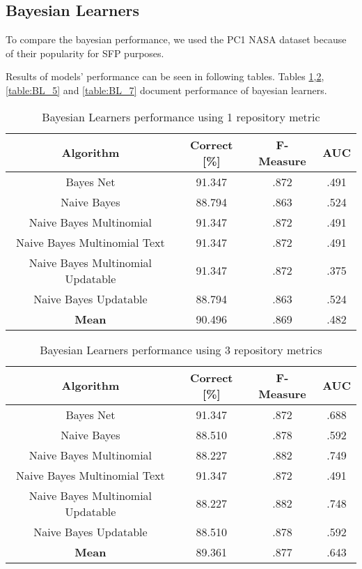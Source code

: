 \subsection{Bayesian Learners}
To compare the bayesian performance, we used the PC1 NASA dataset because of their popularity for SFP purposes.

Results of models' performance can be seen in following tables. Tables \ref{table:BL_1},\ref{table:BL_3}, \ref{table:BL_5} and \ref{table:BL_7} document performance of bayesian learners.				


\begin{table}[h!]		
\centering		
\begin{tabular}{ |c|c|c|c| } 		
 \hline		
 \textbf{Algorithm} & \textbf{Correct [\%]} & \textbf{F-Measure} & \textbf{AUC}  \\ 		
 \hline		
 Bayes Net & 91.347 & .872 & .491    \\ 		
 \hline		
 Naive Bayes &  88.794 & .863 & .524   \\ 		
 \hline		
  Naive Bayes Multinomial & 91.347 & .872 & .491\\ 		
 \hline		
  Naive Bayes Multinomial Text & 91.347 & .872 & .491  \\ 		
 \hline		
  Naive Bayes Multinomial Updatable & 91.347 & .872 & .375 \\ 		
 \hline		
  Naive Bayes Updatable & 88.794 & .863 & .524 \\ 		
 \hline	
 \textbf{Mean}  & 90.496 & .869 & .482 \\ 		
 \hline
		
\end{tabular}		
\caption{Bayesian Learners performance using 1 repository metric}		
\label{table:BL_1}		
\end{table}

\begin{table}[h!]		
\centering		
\begin{tabular}{ |c|c|c|c| } 		
 \hline		
 \textbf{Algorithm} & \textbf{Correct [\%]} & \textbf{F-Measure} & \textbf{AUC}  \\ 		
 \hline		
 Bayes Net & 91.347 & .872 & .688    \\ 		
 \hline		
 Naive Bayes &  88.510 & .878 & .592   \\ 		
 \hline		
  Naive Bayes Multinomial & 88.227 & .882 & .749\\ 		
 \hline		
  Naive Bayes Multinomial Text & 91.347 & .872 & .491  \\ 		
 \hline		
  Naive Bayes Multinomial Updatable & 88.227 & .882 & .748 \\ 		
 \hline		
  Naive Bayes Updatable & 88.510 & .878 & .592 \\ 		
 \hline	
 \textbf{Mean}  & 89.361 & .877 & .643 \\ 		
 \hline
		
\end{tabular}		
\caption{Bayesian Learners performance using 3 repository metrics}		
\label{table:BL_3}		
\end{table}

